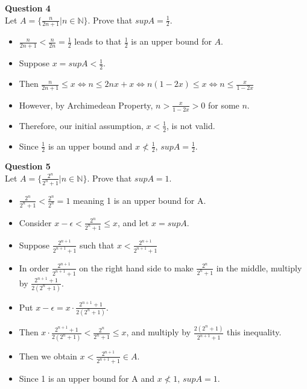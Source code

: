 \documentclass[12pt]{article}
\begin{document}
\newpage
\textbf{Question 4}\\
Let $A = \{\frac{n}{2n+1}|n\in\mathbb{N}\}.$ Prove that $supA = \frac{1}{2}.$

\begin{itemize}
    \item $\frac{n}{2n+1} < \frac{n}{2n} = \frac{1}{2}$ leads to that $\frac{1}{2}$ is an upper bound for $A$.
    \item Suppose $x = supA < \frac{1}{2}.$
    \item Then $\frac{n}{2n+1} \le x \Leftrightarrow n \le 2nx + x \Leftrightarrow n(1-2x) \le x \Leftrightarrow n \le \frac{x}{1-2x}$
    \item However, by Archimedean Property, $n > \frac{x}{1-2x} > 0$ for some $n$.
    \item Therefore, our initial assumption, $x < \frac{1}{2}$, is not valid.
    \item Since $\frac{1}{2}$ is an upper bound and $x \nless \frac{1}{2}$, $supA = \frac{1}{2}.$
\end{itemize}
\vspace{1.5\baselineskip}

\textbf{Question 5}\\
Let $A = \{\frac{2^n}{2^n+1}|n\in\mathbb{N}\}.$ Prove that $supA = 1.$
\begin{itemize}
    \item $\frac{2^n}{2^n+1} < \frac{2^n}{2^n} = 1$ meaning 1 is an upper bound for A.
    \item Consider $x - \epsilon < \frac{2^n}{2^n+1} \le x$, and let $x = supA$.
    
    \item Suppose $\frac{2^{n+1}}{2^{n+1}+1}$ such that $x < \frac{2^{n+1}}{2^{n+1}+1}$
    \item In order $\frac{2^{n+1}}{2^{n+1}+1}$ on the right hand side to make
    $\frac{2^{n}}{2^{n}+1}$ in the middle, multiply by $\frac{2^{n+1}+1}{2(2^n+1)}$.
    \item Put $x - \epsilon = x\cdot \frac{2^{n+1}+1}{2(2^n+1)}$.
    \item Then $x\cdot \frac{2^{n+1}+1}{2(2^n+1)} < \frac{2^{n}}{2^{n}+1} \le x$, and multiply by $\frac{2(2^n+1)}{2^{n+1}+1}$ this inequality.
    \item Then we obtain $x < \frac{2^{n+1}}{2^{n+1}+1} \in A$.
    \item Since 1 is an upper bound for A and $x \nless 1$, $supA = 1$.

\end{itemize}
\end{document}
